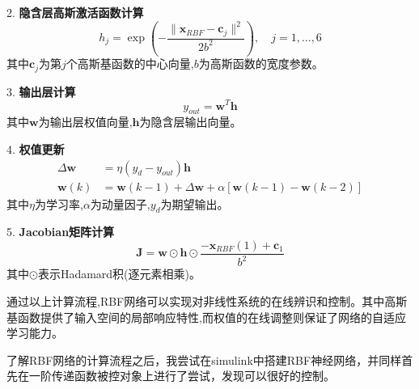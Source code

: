 \documentclass[12pt,a4paper,UTF8]{article}
\begin{document}
2. \textbf{隐含层高斯激活函数计算}
   \begin{equation}
   h_j = \exp\left(-\frac{\|\mathbf{x}_{RBF} - \mathbf{c}_j\|^2}{2b^2}\right), \quad j=1,\ldots,6
   \end{equation}
   其中$\mathbf{c}_j$为第$j$个高斯基函数的中心向量,$b$为高斯函数的宽度参数。

3. \textbf{输出层计算}
   \begin{equation}
   y_{out} = \mathbf{w}^T\mathbf{h}
   \end{equation}
   其中$\mathbf{w}$为输出层权值向量,$\mathbf{h}$为隐含层输出向量。

4. \textbf{权值更新}
   \begin{equation}
   \begin{aligned}
   \Delta\mathbf{w} &= \eta(y_d - y_{out})\mathbf{h} \\
   \mathbf{w}(k) &= \mathbf{w}(k-1) + \Delta\mathbf{w} + \alpha[\mathbf{w}(k-1) - \mathbf{w}(k-2)]
   \end{aligned}
   \end{equation}
   其中$\eta$为学习率,$\alpha$为动量因子,$y_d$为期望输出。

5. \textbf{Jacobian矩阵计算}
   \begin{equation}
   \mathbf{J} = \mathbf{w} \odot \mathbf{h} \odot \frac{-\mathbf{x}_{RBF}(1) + \mathbf{c}_1}{b^2}
   \end{equation}
   其中$\odot$表示Hadamard积(逐元素相乘)。

通过以上计算流程,RBF网络可以实现对非线性系统的在线辨识和控制。其中高斯基函数提供了输入空间的局部响应特性,而权值的在线调整则保证了网络的自适应学习能力。


了解RBF网络的计算流程之后，我尝试在simulink中搭建RBF神经网络，并同样首先在一阶传递函数被控对象上进行了尝试，发现可以很好的控制。
\end{document}
